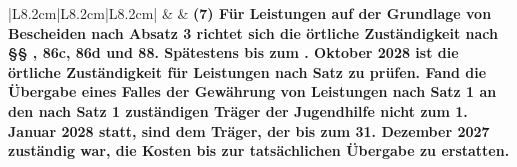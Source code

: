 \documentclass[10pt,a4paper,landscape]{article}
\begin{document}
\begin{longtable}{|L{8.2cm}|L{8.2cm}|L{8.2cm}|}
 &  & \textbf{\textcolor{diffgreen}{(7) Für Leistungen auf der Grundlage  \newline von Bescheiden nach Absatz 3 richtet  \newline sich die örtliche Zuständigkeit nach \S{}\S{}  , 86c, 86d und 88. Spätestens bis zum  . Oktober 2028 ist die örtliche  \newline Zuständigkeit für Leistungen nach Satz   zu prüfen. Fand die Übergabe eines  \newline Falles der Gewährung von Leistungen  \newline nach Satz 1 an den nach Satz 1  \newline zuständigen Träger der Jugendhilfe  \newline nicht zum 1. Januar 2028 statt, sind dem  \newline Träger, der bis zum 31. Dezember 2027  \newline zuständig war, die Kosten bis zur  \newline tatsächlichen Übergabe zu erstatten.}} \\
\hhline{|---|}
\end{longtable}
\newpage
\end{document}
